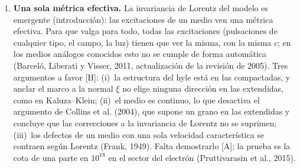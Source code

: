 \documentclass[11pt,a4paper]{article}
\newcommand{\st}[1]{\textup{[#1]}}
\begin{document}
\begin{enumerate}[label=\arabic*.,ref=\arabic*,leftmargin=*]
\item \label{ab:metrica}\textbf{Una sola métrica efectiva.} La invariancia de Lorentz del modelo es emergente (introducción): las excitaciones de un medio ven una métrica efectiva. Para que valga para todo, todas las excitaciones (pulsaciones de cualquier tipo, el campo, la luz) tienen que ver la misma, con la misma $c$; en los medios análogos conocidos esto no se cumple de forma automática (Barceló, Liberati y Visser, 2011, actualización de la revisión de 2005). Tres argumentos a favor \st{H}: (i)~la estructura del hyle está en las compactadas, y anclar el marco a la normal $\xi$ no elige ninguna dirección en las extendidas, como en Kaluza--Klein; (ii)~el medio es continuo, lo que desactiva el argumento de Collins et al. (2004), que supone un grano en las extendidas y concluye que las correcciones a la invariancia de Lorentz no se suprimen; (iii)~los defectos de un medio con una sola velocidad característica se contraen según Lorentz (Frank, 1949). Falta demostrarlo \st{A}; la prueba es la cota de una parte en $10^{18}$ en el sector del electrón (Pruttivarasin et al., 2015).


\end{enumerate}
\end{document}
